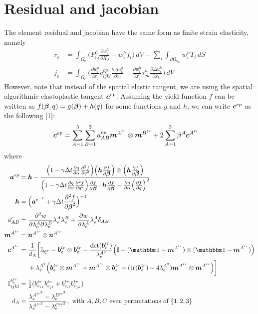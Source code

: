 \documentclass[10pt]{article}
\begin{document}
\section{Residual and jacobian}
The element residual and jacobian have the same form as finite strain elasticity, namely
\begin{align}
r_e &= \int_{\Omega_e} \Big(P^h_{iJ} \frac{\partial w^h_i}{\partial X_J} - w^h_i f_i \Big) \, dV
- \sum_i \int_{\partial \Omega_{e_{T_i}}} w^h_i T_i \, dS\\
j_e &=  \int_{\Omega_e} \Big( \frac{\partial w^h_i}{\partial x_j} c^{ep}_{ijkl} \frac{\partial \Delta u^h_k}{\partial x_l}
+ \frac{\partial w^h_i}{\partial x_j} \tau^h_{jk} \frac{\partial \Delta u^h_i}{\partial x_k} \Big) \, dV
\end{align}
However, note that instead of the spatial elastic tangent, we are using the spatial algorithmic elastoplastic tangent $\mbox{\boldmath$ c$}^{ep}$. Assuming the yield function $f$ can be written as $f(\mbox{\boldmath$\beta$},q) = g(\mbox{\boldmath$\beta$}) + h(q)$ for some functions $g$ and $h$, we can write $\mbox{\boldmath$ c$}^{ep}$ as the following [1]:
\begin{align}
\mbox{\boldmath$ c$}^{ep} &= \sum_{A=1}^3 \sum_{B=1}^3 a^{ep}_{AB} \mbox{\boldmath$ m$}^{A^{tr}}\otimes\mbox{\boldmath$ m$}^{B^{tr}}
+
2\sum_{A=1}^3 \beta^A \mbox{\boldmath$ c$}^{A^{tr}}
\label{eqn:cep}
\end{align}
where
\begin{align}
\ba^{ep} &= \bh - \frac{\Big(1 - \gamma \Delta t \frac{\partial q}{\partial \alpha} \frac{\partial^2 f}{\partial q^2}\Big)
\Big(\bh \frac{\partial f}{\partial \Bbeta} \Big)\otimes\Big(\bh \frac{\partial f}{\partial \Bbeta} \Big)}
{\Big(1 - \gamma \Delta t \frac{\partial q}{\partial \alpha} \frac{\partial^2 f}{\partial q^2}\Big)
\frac{\partial f}{\partial \Bbeta}\cdot\bh \frac{\partial f}{\partial \Bbeta}
- \frac{\partial q}{\partial \alpha}\Big(\frac{\partial f}{\partial q}\Big)^2}\\
\bh &= \Big(\ba^{e^{-1}} + \gamma \Delta t \frac{\partial^2 f}{\partial \Bbeta^2}
\Big)^{-1}\\
a^e_{AB} &= \frac{\partial^2 w}{\partial \lambda^A_e \partial \lambda^B_e}
\lambda^A_e \lambda^B_e
+
\frac{\partial w}{\partial \lambda^A_e}
\lambda^A_e \delta_{AB}\\
\bm^{A^{tr}} &= \bn^{A^{tr}}\otimes\bn^{A^{tr}}\\
\bc^{A^{tr}} &=
\begin{aligned}[t]
&\frac{1}{d_A} \bigg[
\mathbb{I}_{b^{tr}_e} - \bb^{tr}_e \otimes \bb^{tr}_e - \frac{\det(\bb^{tr}_e)}{\lambda^{A^{2}}_e}
\Big(
\mathbb{I} - (\iso - \bm^{A^{tr}})\otimes(\iso - \bm^{A^{tr}})
\Big)\\
&+
\lambda^{A^{2}}_e
\Big(
\bb^{tr}_e \otimes\bm^{A^{tr}} + \bm^{A^{tr}} \otimes\bb^{tr}_e
+
(\tr(\bb^{tr}_e) - 4\lambda^{A^{2}}_e)\bm^{A^{tr}}\otimes\bm^{A^{tr}}
\Big)
\bigg]
\end{aligned}\\
\mathbb{I}^{b^{tr}_e}_{ijkl} &= \half(b^{tr}_{e_{ik}}b^{tr}_{e_{jl}} + b^{tr}_{e_{il}}b^{tr}_{e_{jk}})\\
d_A &= \frac{\lambda^{A^{tr^2}}_e - \lambda^{B^{tr^2}}_e}{\lambda^{A^{tr^2}}_e - \lambda^{C^{tr^2}}_e},
\text{ with $A,B,C$ even permutations of } \{1,2,3\}
\end{align}
\end{document}
